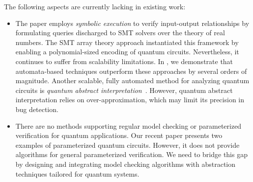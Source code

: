 The following aspects are currently lacking in existing work:
%
\begin{itemize}
\item
The paper \citep{BauerMarquartLS23} employs \emph{symbolic execution} \citep{10.1145/360248.360252} to verify input-output relationships by formulating queries discharged to SMT solvers over the theory of real numbers.
%
The SMT array theory approach \citep{DBLP:conf/cade/ChenRT23} instantiated this framework by enabling a polynomial-sized encoding of quantum circuits. Nevertheless, it continues to suffer from scalability limitations.
%
In \citep{DBLP:journals/pacmpl/AbdullaCCHLLLT25,PLanQC25}, we demonstrate that automata-based techniques outperform these approaches by several orders of magnitude.
%
Another scalable, fully automated method for analyzing quantum circuits is \emph{quantum abstract interpretation}~\citep{yu2021quantum,perdrix2008quantum}.
%
However, quantum abstract interpretation relies on over-approximation, which may limit its precision in bug detection.
%

\item
There are no methods supporting regular model checking or parameterized verification for quantum applications.
%
Our recent paper \citep{DBLP:journals/pacmpl/AbdullaCCHLLLT25} presents two examples of parameterized quantum circuits.
%
However, it does not provide algorithms for general parameterized verification.
%
We need to bridge this gap by designing and integrating model checking algorithms with abstraction techniques tailored for quantum systems.
\end{itemize}
